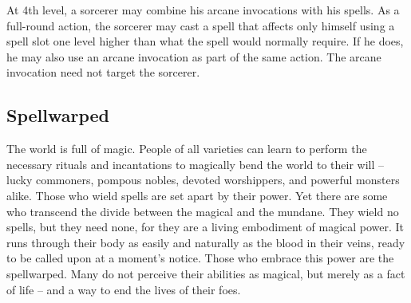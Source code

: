  At 4th level, a sorcerer may combine his arcane invocations with his spells. As a full-round action, the sorcerer may cast a spell that affects only himself using a spell slot one level higher than what the spell would normally require. If he does, he may also use an arcane invocation as part of the same action. The arcane invocation need not target the sorcerer.

\subsection{Spellwarped}
The world is full of magic. People of all varieties can learn to perform the necessary rituals and incantations to magically bend the world to their will -- lucky commoners, pompous nobles, devoted worshippers, and powerful monsters alike. Those who wield spells are set apart by their power. Yet there are some who transcend the divide between the magical and the mundane. They wield no spells, but they need none, for they are a living embodiment of magical power. It runs through their body as easily and naturally as the blood in their veins, ready to be called upon at a moment's notice. Those who embrace this power are the spellwarped. Many do not perceive their abilities as magical, but merely as a fact of life -- and a way to end the lives of their foes.

